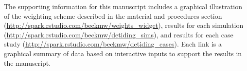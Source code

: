 The supporting information for this manuscript includes a graphical illustration of the weighting scheme described in the material and procedures section (\href{http://spark.rstudio.com/beckmw/weights_widget}{http://spark.rstudio.com/beckmw/weights\_widget}), results for each simulation (\href{http://spark.rstudio.com/beckmw/detiding_sims}{http://spark.rstudio.com/beckmw/detiding\_sims}), and results for each case study (\href{http://spark.rstudio.com/beckmw/detiding_cases}{http://spark.rstudio.com/beckmw/detiding\_cases}).  Each link is a graphical summary of data based on interactive inputs to support the results in the manuscript.